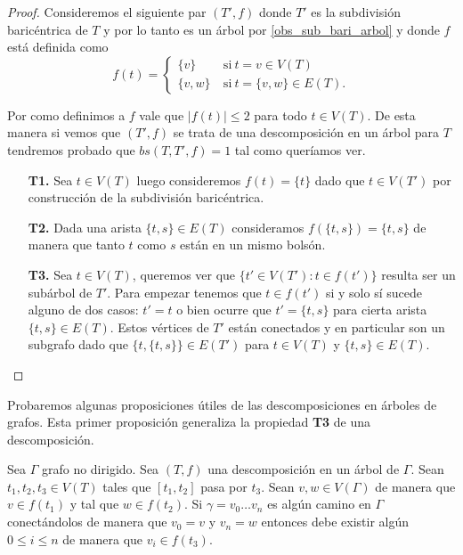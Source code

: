 \documentclass[tesis.tex]{subfiles}
\begin{document}
\begin{proof}
	Consideremos el siguiente par $(T',f)$ donde $T'$ es la subdivisión baricéntrica de $T$ y por lo tanto es un árbol por \ref{obs_sub_bari_arbol} y donde $f$ está definida como
	\[
	f(t) = 
	\begin{cases}
		\{ v \} \ & \text{si} \ t = v \in V(T) 				\\
		\{ v,w  \} \ &\text{si} \ t = \{ v,w\} \in E(T).
	\end{cases}
	\]
	
	
	Por como definimos a $f$ vale que $|f(t)| \le 2$ para todo $t \in V(T)$.
	De esta manera si vemos que $(T',f)$ se trata de una descomposición en un árbol para $T$ tendremos probado que $bs(T,T',f) = 1$ tal como queríamos ver.
	
	\begin{enumerate}
		\item[\textbf{T1.}] 
		Sea $t \in V(T)$ luego consideremos $f(t) = \{ t \}$ dado que $t \in V(T')$ por construcción de la subdivisión baricéntrica.
		
		\item[\textbf{T2.}] 
		Dada una arista $\{t,s\} \in E(T)$ consideramos $f(\{ t,s \}) = \{ t,s \} $ de manera que tanto $t$ como $s$ están en un mismo bolsón.
		
		\item[\textbf{T3.}] 
		Sea $t \in V(T)$, queremos ver que $\{ t' \in V(T') :  t \in f(t') \}$ resulta ser un subárbol de $T'$.		
		Para empezar tenemos que $t \in f(t')$ si y solo sí sucede alguno de dos casos:
		$t' = t$ o bien ocurre que $t' = \{ t,s \}$ para cierta arista $\{t,s\} \in E(T)$.
		Estos vértices de $T'$ están conectados y en particular son un subgrafo dado que $ \{t, \{t,s\}\} \in E(T')$ para $t \in V(T)$ y $\{t,s\} \in E(T)$. 
	\end{enumerate}
	
\end{proof}
	
	


Probaremos algunas proposiciones útiles de las descomposiciones en árboles de grafos.
Esta primer proposición generaliza la propiedad \textbf{T3} de una descomposición.
\begin{prop}\label{prop-camino-desc}
	Sea $\Gamma$ grafo no dirigido.
	Sea $(T,f)$ una descomposición en un árbol de $\Gamma$.
	Sean $t_{1},t_{2},t_{3} \in V(T)$ tales que $[t_1,t_2]$ pasa por $t_{3}$.
	Sean $v,w \in V(\Gamma)$ de manera que $v \in f(t_{1})$ y tal que $w \in f(t_{2})$.
	Si $\gamma = v_0 \dots v_n$ es algún camino en $\Gamma$ conectándolos de manera que $v_{0}=v$ y $v_{n} = w$	
	entonces debe existir algún $ 0 \le i \le n$ de manera que $v_i \in f(t_{3})$. 
\end{prop}
\end{document}
